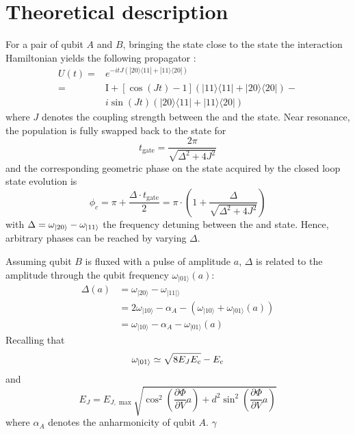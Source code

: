 \section{Theoretical description}
For a pair of qubit $A$ and $B$, bringing the \oo state close to the \tz state the interaction Hamiltonian yields the following propagator \cite[p.~87]{Heinsoo2018}: 
\begin{equation}
    \begin{aligned}
U(t)=& e^{-i t J(|20\rangle\langle 11 |+|  11 \rangle \langle 20|)} \\
=& \mathrm{I}+\left[\cos \left(J t\right)-1\right](|11\rangle\langle 11|+| 20\rangle\langle 20|)-\\
& i \sin \left(J t\right)(|20\rangle\langle 11|+| 11\rangle\langle 20|)
\end{aligned}
\end{equation}
 where $J$ denotes the coupling strength between the \oo and the \tz state. Near resonance, the population is fully swapped back to the \oo state for
 \begin{equation}
     t_{\textrm{gate}} = \frac{2\pi} { \sqrt { \Delta ^ { 2 } + 4 J ^ { 2 } } }
 \end{equation} 
 and the corresponding geometric phase on the \oo state acquired by the closed loop state evolution is 
 \begin{equation}
     \phi_{ c } = \pi + \frac{\Delta \cdot t_{\textrm{gate}}}{2} = \pi \cdot \left( 1 + \frac { \Delta } { \sqrt { \Delta ^ { 2 } + 4 J ^ { 2 } } } \right)
 \end{equation}
 with $\Delta = \omega_{\ket{20}} - \omega_{\ket{11}}$ the frequency detuning between the \tz and \oo state. Hence, arbitrary phases can be reached by varying $\Delta$.
 
 Assuming qubit $B$ is fluxed with a pulse of amplitude $a$, $\Delta$ is related to the amplitude through the qubit frequency $\omega _ { | 01 \rangle }(a)$:
 \begin{equation}
\begin{aligned} 
\Delta(a) & = \omega _ { | 20 \rangle } - \omega _ { | 11 | \rangle } \\ 
& = 2 \omega _ { | 10 \rangle } - \alpha _ { A } - \left( \omega _ { | 10 \rangle } + \omega _ { | 01 \rangle }(a) \right) \\ 
& = \omega _ { | 10 \rangle } - \alpha _ { A } - \omega _ { | 01 \rangle }(a) 
\end{aligned}
\end{equation}
Recalling that
\begin{equation}
    \omega_{\ket{01}} \simeq \sqrt{8E_J E_c} - E_c
\end{equation}
and 
\begin{equation}
    E_J = E _ { J , \max } \sqrt { \cos ^ { 2 } \left( \frac { \partial \Phi } { \partial V } a \right) + d ^ { 2 } \sin ^ { 2 } \left( \frac { \partial \Phi} { \partial V } a \right) }
\end{equation}
where $\alpha_A$ denotes the anharmonicity of qubit $A$. $\gamma$

